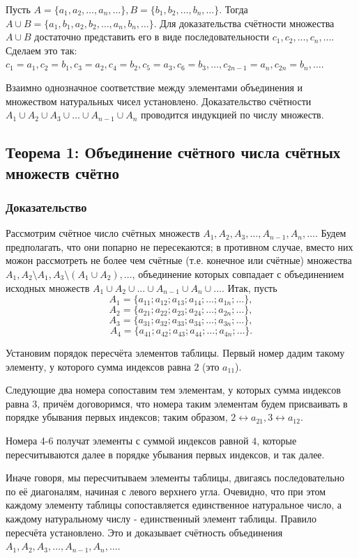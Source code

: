\documentclass{article}
\begin{document}
Пусть ${A = \{a_1, a_2, \dots, a_n, \dots \}}, {B = \{b_1, b_2, \dots, b_n, \dots\}}$. Тогда ${A \cup B = \{a_1, b_1, a_2, b_2, \dots, a_n, b_n, \dots\}}$. Для доказательства счётности множества $A \cup B$ достаточно представить его в виде последовательности $c_1, c_2, \dots, c_n, \dots$. Сделаем это так: $c_1 = a_1, c_2 = b_1, c_3 = a_2, c_4 = b_2, c_5 = a_3, c_6 = b_3, \dots, c_{2n-1} = a_n, c_{2n} = b_n, \dots$.

Взаимно однозначное соответствие между элементами объединения и множеством натуральных чисел установлено. Доказательство счётности $A_1 \cup A_2 \cup A_3 \cup \dots \cup A_{n-1} \cup A_n$ проводится индукцией по числу множеств.

\subsection{Теорема 1: Объединение счётного числа счётных множеств счётно}
\subsubsection*{Доказательство}
Рассмотрим счётное число счётных множеств $A_1, A_2, A_3, \dots, A_{n-1}, A_n, \dots$. Будем предполагать, что они попарно не пересекаются; в противном случае, вместо них можон рассмотреть не более чем счётные (т.е. конечное или счётные) множества ${A_1, A_2 \setminus A_1, A_3 \setminus (A_1 \cup A_2), \dots}$, объединение которых совпадает с объединением исходных множеств ${A_1 \cup A_2 \cup ... \cup A_{n-1} \cup A_n \cup \dots}$. Итак, пусть \[
	A_1 = \{a_{11}; a_{12}; a_{13}; a_{14}; \dots; a_{1n}; \dots \}, \]\[
	A_2 = \{a_{21}; a_{22}; a_{23}; a_{24}; \dots; a_{2n}; \dots \}, \]\[
	A_3 = \{a_{31}; a_{32}; a_{33}; a_{34}; \dots; a_{3n}; \dots \}, \]\[
	A_4 = \{a_{41}; a_{42}; a_{43}; a_{44}; \dots; a_{4n}; \dots \}.
\]	

Установим порядок пересчёта элементов таблицы. Первый номер дадим такому элементу, у которого сумма индексов равна $2$ (это $a_{11}$). 

Следующие два номера сопоставим тем элементам, у которых сумма индексов равна $3$, причём договоримся, что номера таким элементам будем присваивать в порядке убывания первых индексов; таким образом, $2 \leftrightarrow a_{21}, 3 \leftrightarrow a_{12}$. 

Номера 4-6 получат элементы с суммой индексов равной $4$, которые пересчитываются далее в порядке убывания первых индексов, и так далее.

Иначе говоря, мы пересчитываем элементы таблицы, двигаясь последовательно по её диагоналям, начиная с левого верхнего угла. Очевидно, что при этом каждому элементу таблицы сопоставляется единственное натуральное число, а каждому натуральному числу - единственный элемент таблицы. Правило пересчёта установлено. Это и доказывает счётность объединения $A_1, A_2, A_3, \dots, A_{n-1}, A_n, \dots$.
\end{document}
